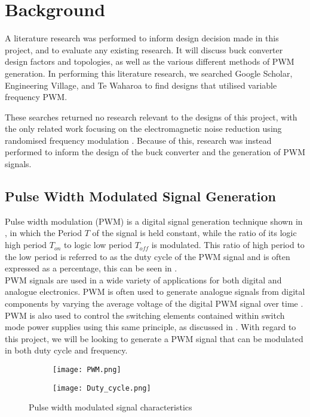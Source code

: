\chapter{Background}\label{C:background}

A literature research was performed to inform design decision made in this project, and to evaluate any existing research. It will discuss buck converter design factors and topologies, as well as the various different methods of PWM generation. In performing this literature research, we searched Google Scholar, Engineering Village, and Te Waharoa to find designs that utilised variable frequency PWM. 

These searches returned no research relevant to the designs of this project, with the only related work focusing on the electromagnetic noise reduction using randomised frequency modulation \cite{Roman2001,Familiant2016}. Because of this, research was instead performed to inform the design of the buck converter and the generation of PWM signals.

\section{Pulse Width Modulated Signal Generation}\label{S:PWM_back}

Pulse width modulation (PWM) is a digital signal generation technique shown in , in which the Period $T$ of the signal is held constant, while the ratio of its logic high period $T_{on}$ to logic low period $T_{off}$ is modulated. This ratio of high period to the low period is referred to as the duty cycle of the PWM signal and is often expressed as a percentage, this can be seen in .\\

PWM signals are used in a wide variety of applications for both digital and analogue electronics. PWM is often used to generate analogue signals from digital components by varying the average voltage of the digital PWM signal over time \cite{Tareen2019}. PWM is also used to control the switching elements contained within switch mode power supplies using this same principle, as discussed in . With regard to this project, we will be looking to generate a PWM signal that can be modulated in both duty cycle and frequency.

\begin{figure}[H]
      \centering
      \begin{subfigure}{0.45\textwidth}
          \texttt{[image: PWM.png]}
          \label{F:PWM}
      \end{subfigure}
      \hspace{10pt}
      \begin{subfigure}{0.5\textwidth}
          \texttt{[image: Duty\_cycle.png]}
          \vspace{-6pt}
          \label{F:Duty}
      \end{subfigure}
      \caption{Pulse width modulated signal characteristics}
      \label{F:PWM_description}
  \end{figure}

